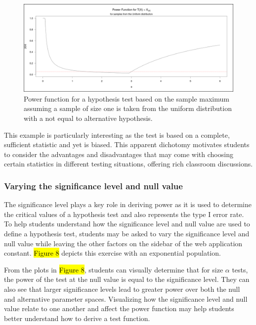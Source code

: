 \documentclass{TISE}
\begin{document}
\begin{figure}[H]
	\centering
	\includegraphics[width=\linewidth]{varyalt2.png}
	\caption{Power function for a hypothesis test based on the sample maximum assuming a sample of size one is taken from the uniform distribution with a not equal to alternative hypothesis.}
\end{figure}

This example is particularly interesting as the test is based on a complete, sufficient statistic and yet is biased. This apparent dichotomy motivates students to consider the advantages and disadvantages that may come with choosing certain statistics in different testing situations, offering rich classroom discussions. 

\subsubsection{Varying the significance level and null value}

The significance level plays a key role in deriving power as it is used to determine the critical values of a hypothesis test and also represents the type I error rate. To help students understand how the significance level and null value are used to define a hypothesis test, students may be asked to vary the significance level and null value while leaving the other factors on the sidebar of the web application constant. \hl{Figure 8} depicts this exercise with an exponential population. 

From the plots in \hl{Figure 8}, students can visually determine that for size $\alpha$ tests, the power of the test at the null value is equal to the significance level. They can also see that larger significance levels lead to greater power over both the null and alternative parameter spaces. Visualizing how the significance level and null value relate to one another and affect the power function may help students better understand how to derive a test function. 
\end{document}
